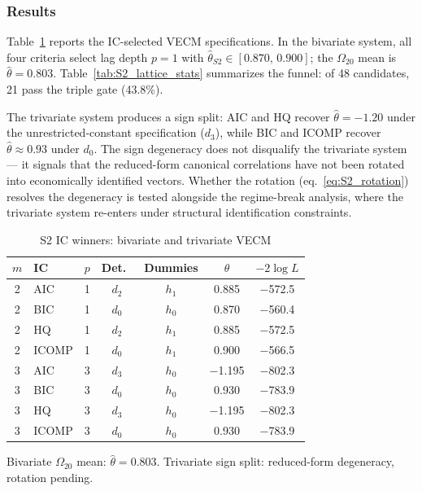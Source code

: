 \documentclass[11pt,a4paper]{article}
\begin{document}

\subsubsection{Results}
\label{subsec:S2_results}

Table~\ref{tab:S2_ic_winners} reports the IC-selected VECM specifications.
In the bivariate system, all four criteria select lag depth $p = 1$ with
$\hat{\theta}_{S2} \in [0.870,\, 0.900]$; the $\Omega_{20}$ mean is
$\hat{\theta} = 0.803$. Table~\ref{tab:S2_lattice_stats} summarizes the
funnel: of 48 candidates, 21 pass the triple gate (43.8\%).

The trivariate system produces a sign split: AIC and HQ recover
$\hat{\theta} = -1.20$ under the unrestricted-constant specification
($d_3$), while BIC and ICOMP recover $\hat{\theta} \approx 0.93$ under
$d_0$. The sign degeneracy does not disqualify the trivariate system --- it
signals that the reduced-form canonical correlations have not been rotated
into economically identified vectors. Whether the rotation
(eq.~\ref{eq:S2_rotation}) resolves the degeneracy is tested alongside the
regime-break analysis, where the trivariate system re-enters under
structural identification constraints.

\begin{table}[!ht]
	\centering
	\small
	\caption{S2 IC winners: bivariate and trivariate VECM}
	\label{tab:S2_ic_winners}
	\begin{tabular}{clccccc}
		\hline\hline
		$m$ & IC & $p$ & Det.\ & Dummies & $\hat{\theta}$ & $-2\log L$ \\
		\hline
		2 & AIC   & 1 & $d_2$ & $h_1$ & 0.885 & $-$572.5 \\
		2 & BIC   & 1 & $d_0$ & $h_0$ & 0.870 & $-$560.4 \\
		2 & HQ    & 1 & $d_2$ & $h_1$ & 0.885 & $-$572.5 \\
		2 & ICOMP & 1 & $d_0$ & $h_1$ & 0.900 & $-$566.5 \\
		\hline
		3 & AIC   & 3 & $d_3$ & $h_0$ & $-$1.195 & $-$802.3 \\
		3 & BIC   & 3 & $d_0$ & $h_0$ & 0.930     & $-$783.9 \\
		3 & HQ    & 3 & $d_3$ & $h_0$ & $-$1.195 & $-$802.3 \\
		3 & ICOMP & 3 & $d_0$ & $h_0$ & 0.930     & $-$783.9 \\
		\hline
	\end{tabular}
	\par\vspace{0.3em}
	\footnotesize
	Bivariate $\Omega_{20}$ mean: $\hat{\theta} = 0.803$.
	Trivariate sign split: reduced-form degeneracy, rotation pending.
\end{table}
\end{document}
